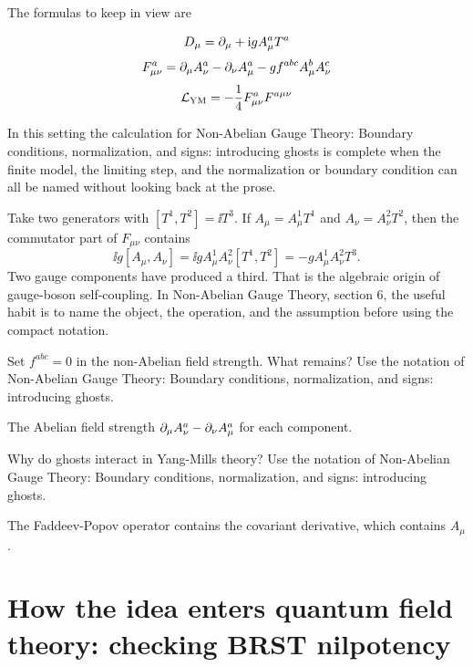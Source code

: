 The formulas to keep in view are

\[
  D_\mu=\partial_\mu+\mathrm i gA_\mu^aT^a
\]
\[
  F_{\mu\nu}^a=\partial_\mu A_\nu^a-\partial_\nu A_\mu^a-gf^{abc}A_\mu^bA_\nu^c
\]
\[
  \mathcal L_{\mathrm{YM}}=-\frac14F_{\mu\nu}^aF^{a\mu\nu}
\]

In this setting the calculation for Non-Abelian Gauge Theory: Boundary conditions, normalization, and signs: introducing ghosts is complete when the finite model, the limiting step, and the normalization or boundary condition can all be named without looking back at the prose.




\begin{example}
Take two generators with \([T^1,T^2]=\ii T^3\).  If \(A_\mu=A_\mu^1T^1\) and \(A_\nu=A_\nu^2T^2\), then the commutator part of \(F_{\mu\nu}\) contains
\[
  \ii g[A_\mu,A_\nu]=\ii gA_\mu^1A_\nu^2[T^1,T^2]=-gA_\mu^1A_\nu^2T^3.
\]
Two gauge components have produced a third.  That is the algebraic origin of gauge-boson self-coupling.  In Non-Abelian Gauge Theory, section 6, the useful habit is to name the object, the operation, and the assumption before using the compact notation.
\end{example}



\begin{exercise}
Set \(f^{abc}=0\) in the non-Abelian field strength.  What remains?  Use the notation of Non-Abelian Gauge Theory: Boundary conditions, normalization, and signs: introducing ghosts.
\begin{answer}
The Abelian field strength \(\partial_\mu A_\nu^a-\partial_\nu A_\mu^a\) for each component.
\end{answer}
\end{exercise}

\begin{exercise}
Why do ghosts interact in Yang-Mills theory?  Use the notation of Non-Abelian Gauge Theory: Boundary conditions, normalization, and signs: introducing ghosts.
\begin{answer}
The Faddeev-Popov operator contains the covariant derivative, which contains \(A_\mu\).
\end{answer}
\end{exercise}



\section{How the idea enters quantum field theory: checking BRST nilpotency}

